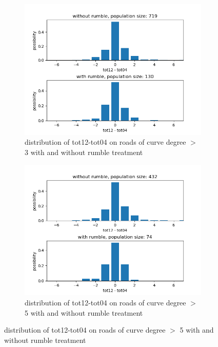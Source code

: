 \documentclass{article}
\begin{document}
\begin{figure}[H]
    \centering
    \begin{subfigure}{.5\textwidth}
        \centering
        \includegraphics[width=1\textwidth]{with-and-without-rumble-curvature-grt3-diff.png}
        \caption{distribution of tot12-tot04 on roads of curve degree $>$ 3     with and without rumble treatment}
        \label{fig:curve-grt3}
    \end{subfigure}%
    \begin{subfigure}{.5\textwidth}
        \centering
        \includegraphics[width=1\textwidth]{with-and-without-rumble-curvature-grt5-diff.png}
        \caption{distribution of tot12-tot04 on roads of curve degree $>$ 5     with and without rumble treatment}
        \label{fig:curve-grt5}
    \end{subfigure}
\end{figure}
\end{document}

